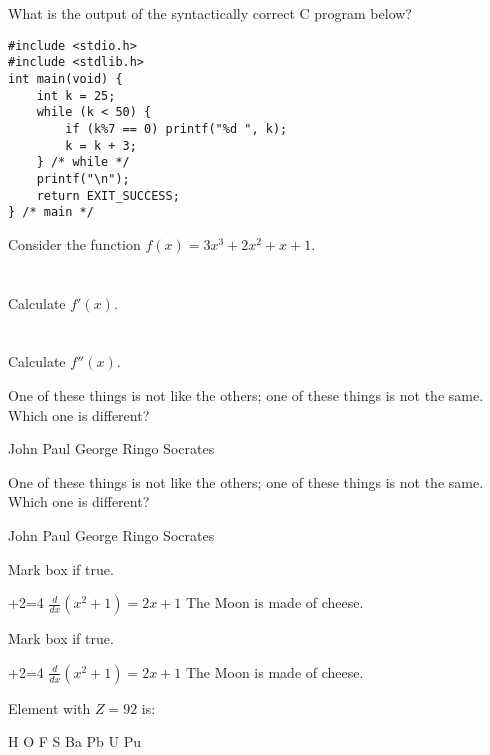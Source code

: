 \documentclass[12pt]{exam}
\begin{document}
\begin{questions}

\question[2] What is the output of the syntactically correct C program below?
\vspace{0.3cm}
\begin{lstlisting}
#include <stdio.h>
#include <stdlib.h>
int main(void) {
	int k = 25;
	while (k < 50) {
		if (k%7 == 0) printf("%d ", k);
		k = k + 3;
	} /* while */
	printf("\n");
	return EXIT_SUCCESS;
} /* main */
\end{lstlisting}
\makeemptybox{1cm}
\addpoints

\question[20] Consider the function $f(x)=3x^3+2x^2+x+1$.
\noaddpoints %
\begin{parts}
\part[10]{} Calculate $f'(x)$.
\part[10]{} Calculate $f''(x)$.
\end{parts}
\addpoints

\question[2] One of these things is not like the others; one of these
things is not the same. Which one is different?
\begin{choices}
\choice John
\choice Paul
\choice George
\choice Ringo
\choice Socrates
\end{choices}

\question[2] One of these things is not like the others; one of these
things is not the same. Which one is different?
\begin{oneparchoices}
\choice John
\choice Paul
\choice George
\choice Ringo
\choice Socrates
\end{oneparchoices}

\question[3] Mark box if true.
\addpoints
\begin{checkboxes}
+2=4
\choice $\frac{d}{dx} (x^2+1) = 2x+1$
\choice The Moon is made of cheese.
\end{checkboxes}

{%
\checkboxchar{$\Box$} %
\question[3] Mark box if true.
\addpoints
\begin{checkboxes}
+2=4
\choice $\frac{d}{dx} (x^2+1) = 2x+1$
\choice The Moon is made of cheese.
\end{checkboxes}
}%

{%
\renewcommand*\thechoice{\arabic{choice}} 
\renewcommand*\choicelabel{\thechoice)}
%
\question[2] Element with $Z=92$ is:
\begin{multicols}{2}
\begin{choices}
\choice H
\choice O
\choice F
\choice S
\choice Ba
\choice Pb
\choice U
\choice Pu
\end{choices}
\end{multicols}
}%


\end{questions}
\end{document}
